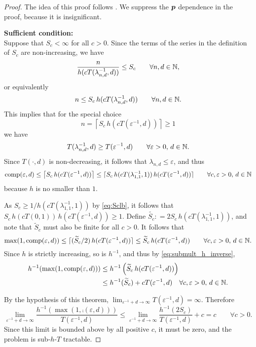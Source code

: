 \documentclass[sort&compress]{elsarticle}
\begin{document}
\begin{proof}
The idea of this proof follows \cite{WerWoz17a}.
We suppress the $\boldsymbol{p}$ dependence in the proof, because it is insignificant.

\bigskip

\noindent \textbf{Sufficient condition:}\\
Suppose that $S_c <\infty$ for all $c>0$.  Since the terms of the series in the definition of $S_c$ are non-increasing, we have
	\[
		\frac{n}{h(cT(\lambda_{n,d}^{-1},d))}\le S_c \qquad \forall n,d \in \mathbb{N},
	\]
or equivalently
\begin{equation} \label{eq:Sclb}
	n\le S_c \, h(cT(\lambda_{n,d}^{-1},d))   \qquad \forall n,d \in \mathbb{N}.
\end{equation}
This implies that for the special choice
\[
	n = \left\lceil
	S_c \, h(cT(\varepsilon^{-1},d))
	\right\rceil \ge 1
\]
	we have
	\[
	T(\lambda_{n,d}^{-1},d) \ge T(\varepsilon^{-1},d) \qquad \forall \varepsilon > 0, \, d \in \mathbb{N}.
	\]
Since $T(\cdot,d)$ is non-decreasing, it follows that $\lambda_{n,d} \le \varepsilon$, and thus
\[
\operatorname{comp}(\varepsilon,d) \le  \left\lceil
S_c \, h(cT(\varepsilon^{-1},d))
\right\rceil \le   \lceil
S_c \, h(cT(\lambda_{1,1}^{-1},1)) \, h(cT(\varepsilon^{-1},d))
\rceil\qquad \forall c, \varepsilon > 0, \, d \in \mathbb{N}
\]
because $h$ is no smaller than $1$.

As $S_c \ge 1/h(cT(\lambda_{1,1}^{-1},1))$ by \eqref{eq:Sclb}, it follows that $S_c \, h(cT(0,1)) \, h(cT(\varepsilon^{-1},d))  \ge 1$.  Define $\widetilde{S_c}: = 2 S_c \, h(cT(\lambda_{1,1}^{-1},1))$, and note that $\widetilde{S}_c$ must also be finite for all $c > 0$.  It follows that
\begin{equation*}
\max(1,\operatorname{comp}(\varepsilon,d))
 \le \lceil
(\widetilde{S}_c/2) \, h(cT(\varepsilon^{-1},d))
\rceil  \le   \widetilde{S}_c \, h(cT(\varepsilon^{-1},d))
\qquad\forall c, \varepsilon > 0, \, d \in \mathbb{N}.
\end{equation*}
Since $h$ is strictly increasing, so is $h^{-1}$, and thus by \eqref{eq:submult_h_inverse},
\begin{align*}
h^{-1}(\max(1,\operatorname{comp}(\varepsilon,d)) ) & \le  h^{-1} \left(
\widetilde{S}_c \, h(cT(\varepsilon^{-1},d))  \right)
\\
&  \le  h^{-1}  (\widetilde{S}_c) + cT (\varepsilon^{-1},d)
\quad \forall c, \varepsilon > 0, \, d \in \mathbb{N}.
\end{align*}

By the hypothesis of this theorem, $\lim_{\varepsilon^{-1} + d \to \infty} T(\varepsilon^{-1},d) = \infty$. Therefore
\begin{equation*}
	\lim_{\varepsilon^{-1} + d \to \infty} \frac{h^{-1}(\max(1,\comp(\varepsilon,d)))}{T(\varepsilon^{-1},d)}
	\le \lim_{\varepsilon^{-1} + d \to \infty} \frac{h^{-1} (2 S_c)}{T(\varepsilon^{-1},d)}  + c = c \qquad\forall c >  0.
\end{equation*}
Since this limit is bounded above by all positive $c$, it must be zero, and the problem is sub-$h$-$T$ tractable.



\end{proof}
\end{document}
